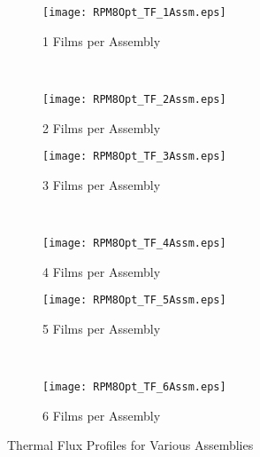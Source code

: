 \begin{figure}
	\centering
	\begin{subfigure}[b]{0.43\textwidth}
		\centering
		\texttt{[image: RPM8Opt\_TF\_1Assm.eps]}
    \caption{1 Films per Assembly}
	\end{subfigure}%
	~
	\begin{subfigure}[b]{0.43\textwidth}
		\centering
		\texttt{[image: RPM8Opt\_TF\_2Assm.eps]}
    \caption{2 Films per Assembly}
	\end{subfigure}	
	
  \begin{subfigure}[b]{0.43\textwidth}
		\centering
		\texttt{[image: RPM8Opt\_TF\_3Assm.eps]}
    \caption{3 Films per Assembly}
	\end{subfigure}%
	~
	\begin{subfigure}[b]{0.43\textwidth}
		\centering
		\texttt{[image: RPM8Opt\_TF\_4Assm.eps]}
    \caption{4 Films per Assembly}
	\end{subfigure}	

	\begin{subfigure}[b]{0.43\textwidth}
		\centering
		\texttt{[image: RPM8Opt\_TF\_5Assm.eps]}
    \caption{5 Films per Assembly}
	\end{subfigure}%
	~
	\begin{subfigure}[b]{0.43\textwidth}
		\centering
		\texttt{[image: RPM8Opt\_TF\_6Assm.eps]}
    \caption{6 Films per Assembly}
	\end{subfigure}

	\caption{Thermal Flux Profiles for Various Assemblies}
	\label{fig:ThermalFlux}
\end{figure}
